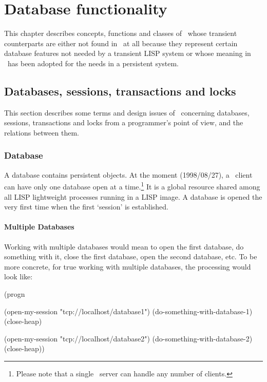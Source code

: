 %

\chapter{Database functionality}

This chapter describes concepts, functions and classes of \plob\ whose
transient counterparts are either not found in \cite{bib:CLtLII}\ at
all because they represent certain database features not needed by a
transient LISP system or whose meaning in \plob\ has been adopted for
the needs in a persistent system.

\section{Databases, sessions, transactions and locks}

This section describes some terms and design issues of \plob\ 
concerning databases, sessions, transactions and locks from a
programmer's point of view, and the relations between them.

\subsection{Database}

A database contains persistent objects. At the moment (1998/08/27), a
\plob\ client can have only one database open at a
time.\footnote{Please note that a single \plob\ server can handle any
  number of clients.} It is a global resource shared among all LISP
lightweight processes running in a LISP image. A database is opened
the very first time when the first `session' is established.

\subsubsection{Multiple Databases}

Working with multiple databases would mean to open the first database,
do something with it, close the first database, open the second
database, etc. To be more concrete, for true working with multiple
databases, the processing would look like:
\begin{IndentedCompactCode}
(progn

  (open-my-session "tcp://localhost/database1")
  (do-something-with-database-1)
  (close-heap)

  (open-my-session "tcp://localhost/database2")
  (do-something-with-database-2)
  (close-heap))
\end{IndentedCompactCode}

